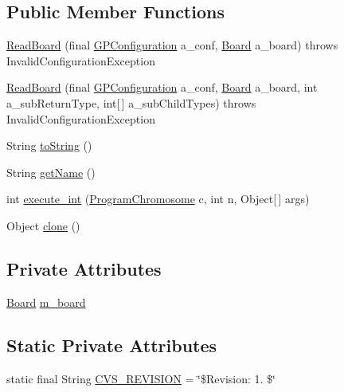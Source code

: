 \subsection*{Public Member Functions}
\begin{DoxyCompactItemize}
\item 
\hyperlink{classexamples_1_1gp_1_1tictactoe_1_1_read_board_a76b5f5ff01e0435ac3c3b325f583e938}{Read\-Board} (final \hyperlink{classorg_1_1jgap_1_1gp_1_1impl_1_1_g_p_configuration}{G\-P\-Configuration} a\-\_\-conf, \hyperlink{classexamples_1_1gp_1_1tictactoe_1_1_board}{Board} a\-\_\-board)  throws Invalid\-Configuration\-Exception 
\item 
\hyperlink{classexamples_1_1gp_1_1tictactoe_1_1_read_board_a94854e5b6e84718ccd93d45c86fd23ad}{Read\-Board} (final \hyperlink{classorg_1_1jgap_1_1gp_1_1impl_1_1_g_p_configuration}{G\-P\-Configuration} a\-\_\-conf, \hyperlink{classexamples_1_1gp_1_1tictactoe_1_1_board}{Board} a\-\_\-board, int a\-\_\-sub\-Return\-Type, int\mbox{[}$\,$\mbox{]} a\-\_\-sub\-Child\-Types)  throws Invalid\-Configuration\-Exception 
\item 
String \hyperlink{classexamples_1_1gp_1_1tictactoe_1_1_read_board_a8a36437a7cdc7644b992b9f23518073c}{to\-String} ()
\item 
String \hyperlink{classexamples_1_1gp_1_1tictactoe_1_1_read_board_a1324f616dbe4d26422cbc4e9d53a79f7}{get\-Name} ()
\item 
int \hyperlink{classexamples_1_1gp_1_1tictactoe_1_1_read_board_ade54ce73f54e74b2fc001b1e4f430247}{execute\-\_\-int} (\hyperlink{classorg_1_1jgap_1_1gp_1_1impl_1_1_program_chromosome}{Program\-Chromosome} c, int n, Object\mbox{[}$\,$\mbox{]} args)
\item 
Object \hyperlink{classexamples_1_1gp_1_1tictactoe_1_1_read_board_a16dc3287840e937283729b9b89616a20}{clone} ()
\end{DoxyCompactItemize}
\subsection*{Private Attributes}
\begin{DoxyCompactItemize}
\item 
\hyperlink{classexamples_1_1gp_1_1tictactoe_1_1_board}{Board} \hyperlink{classexamples_1_1gp_1_1tictactoe_1_1_read_board_a493ed9edf5bff6046b98417fc1ce0537}{m\-\_\-board}
\end{DoxyCompactItemize}
\subsection*{Static Private Attributes}
\begin{DoxyCompactItemize}
\item 
static final String \hyperlink{classexamples_1_1gp_1_1tictactoe_1_1_read_board_ab7010c0fd462b8db73de0af19b97e897}{C\-V\-S\-\_\-\-R\-E\-V\-I\-S\-I\-O\-N} = \char`\"{}\$Revision\-: 1. \$\char`\"{}
\end{DoxyCompactItemize}

